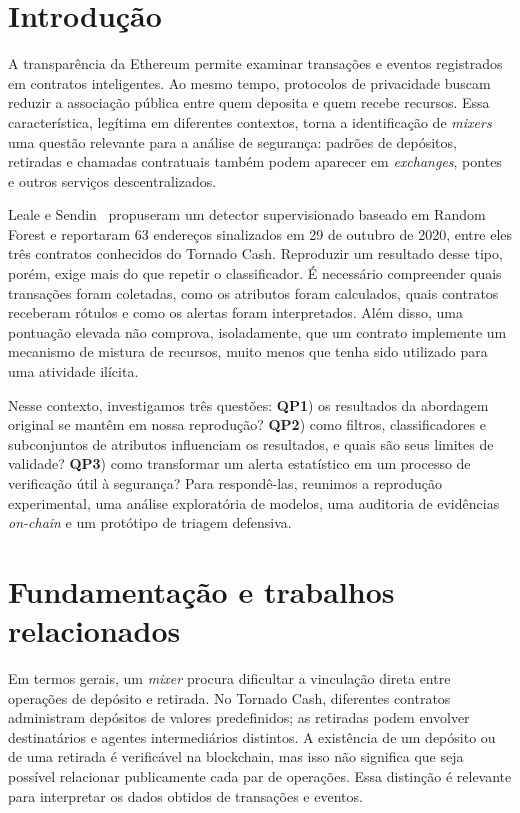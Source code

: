 \documentclass[12pt,a4paper]{article}
\begin{document}
\section{Introdução}
A transparência da Ethereum permite examinar transações e eventos registrados em contratos inteligentes. Ao mesmo tempo, protocolos de privacidade buscam reduzir a associação pública entre quem deposita e quem recebe recursos. Essa característica, legítima em diferentes contextos, torna a identificação de \emph{mixers} uma questão relevante para a análise de segurança: padrões de depósitos, retiradas e chamadas contratuais também podem aparecer em \emph{exchanges}, pontes e outros serviços descentralizados.

Leale e Sendin~\cite{leale2025} propuseram um detector supervisionado baseado em Random Forest e reportaram 63 endereços sinalizados em 29 de outubro de 2020, entre eles três contratos conhecidos do Tornado Cash. Reproduzir um resultado desse tipo, porém, exige mais do que repetir o classificador. É necessário compreender quais transações foram coletadas, como os atributos foram calculados, quais contratos receberam rótulos e como os alertas foram interpretados. Além disso, uma pontuação elevada não comprova, isoladamente, que um contrato implemente um mecanismo de mistura de recursos, muito menos que tenha sido utilizado para uma atividade ilícita.

Nesse contexto, investigamos três questões: \textbf{QP1}) os resultados da abordagem original se mantêm em nossa reprodução? \textbf{QP2}) como filtros, classificadores e subconjuntos de atributos influenciam os resultados, e quais são seus limites de validade? \textbf{QP3}) como transformar um alerta estatístico em um processo de verificação útil à segurança? Para respondê-las, reunimos a reprodução experimental, uma análise exploratória de modelos, uma auditoria de evidências \emph{on-chain} e um protótipo de triagem defensiva.

\section{Fundamentação e trabalhos relacionados}
Em termos gerais, um \emph{mixer} procura dificultar a vinculação direta entre operações de depósito e retirada. No Tornado Cash, diferentes contratos administram depósitos de valores predefinidos; as retiradas podem envolver destinatários e agentes intermediários distintos. A existência de um depósito ou de uma retirada é verificável na blockchain, mas isso não significa que seja possível relacionar publicamente cada par de operações. Essa distinção é relevante para interpretar os dados obtidos de transações e eventos.
\end{document}
